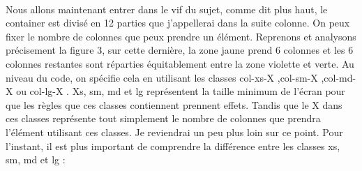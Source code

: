 \documentclass{article}
\begin{document}
\vspace{0.5cm}\\
Nous allons maintenant entrer dans le vif du sujet, comme dit plus haut, le container est divis\'e en 12 parties que j'appellerai dans la suite colonne. On peux fixer le nombre de colonnes que peux prendre un \'el\'ement. Reprenons et analysons pr\'ecisement la figure 3, sur cette derni\`ere, la zone jaune prend 6 colonnes et les 6 colonnes restantes sont r\'eparties \'equitablement entre la zone violette et verte. Au niveau du code, on sp\'ecifie cela en utilisant les classes \og col-xs-X \fg,\og col-sm-X \fg,\og col-md-X \fg ou \og col-lg-X \fg. Xs, sm, md et lg repr\'esentent la taille minimum de l'\'ecran pour que les r\`egles que ces classes contiennent prennent effets. Tandis que le X dans ces classes repr\'esente tout simplement le nombre de colonnes que prendra l'\'el\'ement utilisant ces classes. Je reviendrai un peu plus loin sur ce point. Pour l'instant, il est plus important de comprendre la diff\'erence entre les classes xs, sm, md et lg :
\vspace{0.5cm}\\
\end{document}
